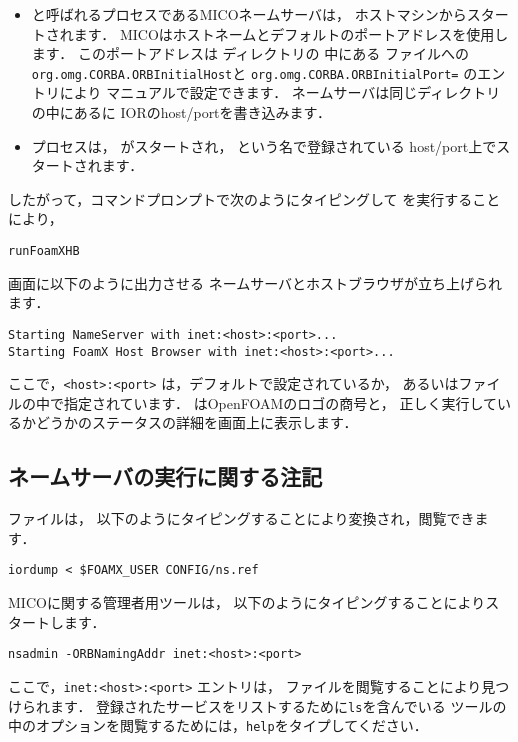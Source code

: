 \begin{itemize}
 \item {}と呼ばれるプロセスであるMICOネームサーバは，
       ホストマシンからスタートされます．
       MICOはホストネームとデフォルトのポートアドレスを使用します．
       このポートアドレスは ディレクトリの
       中にある
%
%
       ファイルへの
       \texttt{org.omg.\allowbreak CORBA.ORBInitialHost}と
       \texttt{org.omg.CORBA.ORBInitialPort=} のエントリにより
       マニュアルで設定できます．
       ネームサーバは同じディレクトリの中にあるに
       IORのhost/portを書き込みます．
 \item {}プロセスは，
       がスタートされ，
       という名で登録されている
       host/port上でスタートされます．
\end{itemize}
したがって，コマンドプロンプトで次のようにタイピングして
を実行することにより，
\begin{OFterminal}
\begin{verbatim}
runFoamXHB
\end{verbatim}
\end{OFterminal}
画面に以下のように出力させる
ネームサーバとホストブラウザが立ち上げられます．
\begin{OFterminal}
\begin{verbatim}
Starting NameServer with inet:<host>:<port>...
Starting FoamX Host Browser with inet:<host>:<port>...
\end{verbatim}
\end{OFterminal}
ここで，\verb|<host>:<port>| は，デフォルトで設定されているか，
あるいはファイルの中で指定されています．
はOpenFOAMのロゴの商号と，
正しく実行しているかどうかのステータスの詳細を画面上に表示します．


\subsection{ネームサーバの実行に関する注記}
\label{ssec:A.1.1}
ファイルは，
以下のようにタイピングすることにより変換され，閲覧できます．
\begin{OFterminal}
\begin{verbatim}
iordump < $FOAMX_USER CONFIG/ns.ref
\end{verbatim}%
\end{OFterminal}
MICOに関する管理者用ツールは，
以下のようにタイピングすることによりスタートします．
\begin{OFterminal}
\begin{verbatim}
nsadmin -ORBNamingAddr inet:<host>:<port>
\end{verbatim}
\end{OFterminal}
ここで，\verb|inet:<host>:<port>| エントリは，
ファイルを閲覧することにより見つけられます．
登録されたサービスをリストするために\texttt{ls}を含んでいる
ツールの中のオプションを閲覧するためには，\texttt{help}をタイプしてください．



